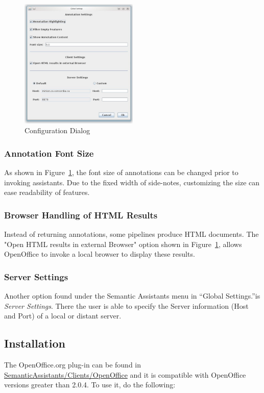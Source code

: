 \begin{figure}[htb]
\begin{center}
  \includegraphics[width=0.5\textwidth]{pictures/oosettings.jpg}
  \caption{Configuration Dialog}
  \label{fig:oosettings}
\end{center}
\end{figure}

\subsubsection{Annotation Font Size}
As shown in Figure~\ref{fig:oosettings}, the font size of annotations can be changed
prior to invoking assistants. Due to the fixed width of side-notes, customizing the
size can ease readability of features.

\subsubsection{Browser Handling of HTML Results}
Instead of returning annotations, some pipelines produce HTML documents. The
"Open HTML results in external Browser" option shown in Figure~\ref{fig:oosettings},
allows OpenOffice to invoke a local browser to display these results.

\subsubsection{Server Settings}
Another option found under the Semantic Assistants menu in ``Global
Settings.''is \emph{Server Settings}.  There the user is able to specify the
Server information (Host and Port) of a local or distant server.

\subsection{Installation}
\label{subsec:oo-inst}
The OpenOffice.org plug-in can be found in
\url{SemanticAssistants/Clients/OpenOffice} and it is compatible with 
OpenOffice versions greater than 2.0.4. To use it, do the following:

